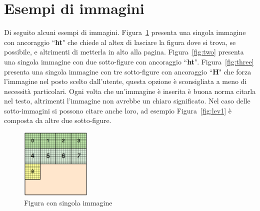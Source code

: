 \section{Esempi di immagini}\label{sec:images}
Di seguito alcuni esempi di immagini.
Figura~\ref{fig:one} presenta una singola immagine con ancoraggio ``\textbf{ht}" che chiede al altex di lasciare la figura dove si trova, se possibile, e altrimenti di metterla in alto alla pagina.
Figura~\ref{fig:two} presenta una singola immagine con due sotto-figure con ancoraggio ``\textbf{ht}".
Figura~\ref{fig:three} presenta una singola immagine con tre sotto-figure con ancoraggio ``\textbf{H}" che forza l'immagine nel posto scelto dall'utente, questa opzione è sconsigliata a meno di necessità particolari.
Ogni volta che un'immagine è inserita è buona norma citarla nel testo, altrimenti l'immagine non avrebbe un chiaro significato.
Nel caso delle sotto-immagini si possono citare anche loro, ad esempio Figura~\ref{fig:lev1} è composta da altre due sotto-figure.
\begin{figure}[ht]
	\centering
	\includegraphics[width=0.3\textwidth]{immagini/block_on_grid.png}
	\caption{Figura con singola immagine}
	\label{fig:one}
\end{figure}

